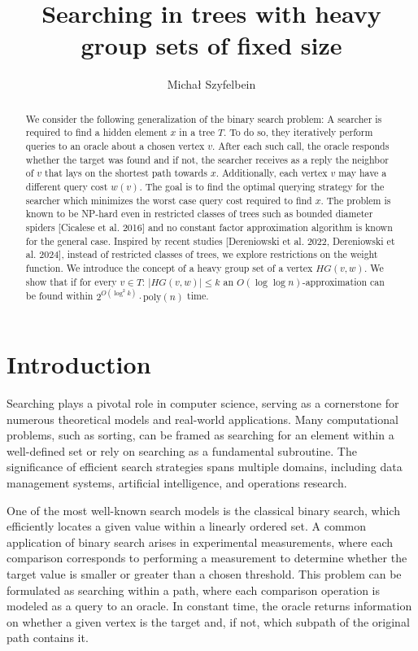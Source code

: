 \documentclass[a4paper, anonymous, numberwithinsect, pdfa, UKenglish,cleveref, autoref, thm-restate]{socg-lipics-v2021}
\title{Searching in trees with heavy group sets of fixed size} %
\author{Michał {Szyfelbein}}{Faculty of Electronics, Telecommunications and Informatics, Gdańsk University of Technology, Poland \and  }{s193307@student.pg.edu.pl}{https://orcid.org/0009-0009-9894-9671}{}%
\newcommand{\br}[1]{\left( #1 \right)}
\begin{document}
\maketitle

\begin{abstract}

We consider the following generalization of the binary search problem: A searcher is required to find a hidden element $x$ in a tree $T$. To do so, they iteratively perform queries to an oracle about a chosen vertex $v$. After each such call, the oracle responds whether the target was found and if not, the searcher receives as a reply the neighbor of $v$ that lays on the shortest path towards $x$. Additionally, each vertex $v$ may have a different query cost $w(v)$. The goal is to find the optimal querying strategy for the searcher which minimizes the worst case query cost required to find $x$. The problem is known to be NP-hard even in restricted classes of trees such as bounded diameter spiders [Cicalese et al. 2016] and no constant factor approximation algorithm is known for the general case. Inspired by recent studies [Dereniowski et al. 2022, Dereniowski et al. 2024], instead of restricted classes of trees, we explore restrictions on the weight function. We introduce the concept of a heavy group set of a vertex $HG(v,w)$. We show that if for every $v\in T$: $|HG\br{v,w}|\leq k$ an $O(\log\log n)$-approximation can be found within $2^{O(\log^2k)}\cdot\text{poly}(n)$ time.  
\end{abstract}

\section{Introduction}
Searching plays a pivotal role in computer science, serving as a cornerstone for numerous theoretical models and real-world applications. Many computational problems, such as sorting, can be framed as searching for an element within a well-defined set or rely on searching as a fundamental subroutine. The significance of efficient search strategies spans multiple domains, including data management systems, artificial intelligence, and operations research.

One of the most well-known search models is the classical binary search, which efficiently locates a given value within a linearly ordered set. A common application of binary search arises in experimental measurements, where each comparison corresponds to performing a measurement to determine whether the target value is smaller or greater than a chosen threshold. This problem can be formulated as searching within a path, where each comparison operation is modeled as a query to an oracle. In constant time, the oracle returns information on whether a given vertex is the target and, if not, which subpath of the original path contains it.
\end{document}
